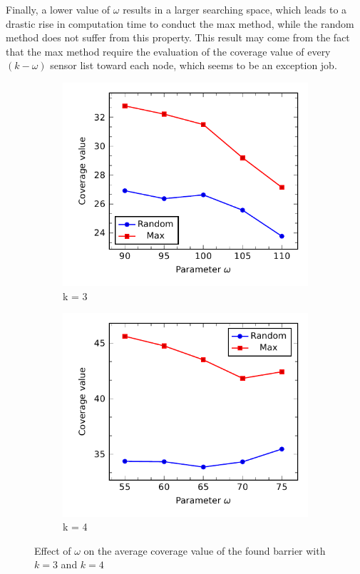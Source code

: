 Finally, a lower value of $\omega$ results in a larger searching space, which leads to a drastic rise in computation time to conduct the max method, while the random method does not suffer from this property. This result may come from the fact that the max method require the evaluation of the coverage value of every $(k-\omega)$ sensor list toward each node, which seems to be an exception job.

\begin{figure}[h]
	\begin{subfigure}[t]{.5\textwidth}
		\centering
		\includegraphics[scale=.8]{Hinhanh/OmegaEffect/coverage/k3.pdf}
		\caption{k = 3}
	\end{subfigure}
	\begin{subfigure}[t]{.5\textwidth}
		\centering
		\includegraphics[scale=.8]{Hinhanh/OmegaEffect/coverage/k4.pdf}		
		\caption{k = 4}
	\end{subfigure}
\caption{Effect of $\omega$ on the average coverage value of the found barrier with $k = 3$ and $k = 4$}
\label{fig:}
\end{figure}
